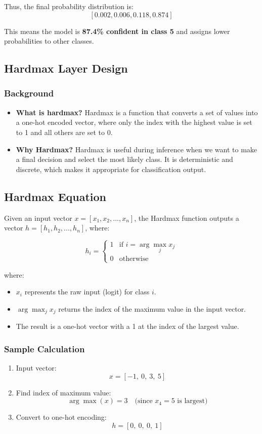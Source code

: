 \documentclass{article}
\begin{document}
Thus, the final probability distribution is:
\[
[0.002, 0.006, 0.118, 0.874]
\]

This means the model is \textbf{87.4\% confident in class 5} and assigns lower probabilities to other classes.

\subsection{Hardmax Layer Design}
\subsubsection{Background} 
\begin{itemize}
  \item \textbf{What is hardmax?}  
    Hardmax is a function that converts a set of values into a one-hot encoded vector, where only the index with the highest value is set to 1 and all others are set to 0.
  \item \textbf{Why Hardmax?}  
    Hardmax is useful during inference when we want to make a final decision and select the most likely class. It is deterministic and discrete, which makes it appropriate for classification output.
\end{itemize}

\subsection{Hardmax Equation}
Given an input vector \( x = [x_1, x_2, ..., x_n] \), the Hardmax function outputs a vector \( h = [h_1, h_2, ..., h_n] \), where:

\[
h_i =
\begin{cases}
1 & \text{if } i = \arg\max_j x_j \\
0 & \text{otherwise}
\end{cases}
\]

\noindent where:
\begin{itemize}
    \item \( x_i \) represents the raw input (logit) for class \( i \).
    \item \( \arg\max_j x_j \) returns the index of the maximum value in the input vector.
    \item The result is a one-hot vector with a 1 at the index of the largest value.
\end{itemize}

\subsubsection{Sample Calculation} 
\begin{enumerate}
    \item Input vector:
    \[
    x = [-1,\ 0,\ 3,\ 5]
    \]

    \item Find index of maximum value:
    \[
    \arg\max(x) = 3 \quad \text{(since } x_4 = 5 \text{ is largest)}
    \]

    \item Convert to one-hot encoding:
    \[
    h = [0,\ 0,\ 0,\ 1]
    \]
\end{enumerate}
\end{document}
